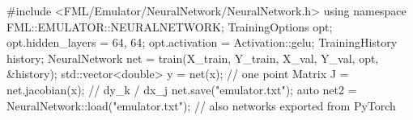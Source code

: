 \begin{cppcode}
#include <FML/Emulator/NeuralNetwork/NeuralNetwork.h>
using namespace FML::EMULATOR::NEURALNETWORK;
TrainingOptions opt;
opt.hidden_layers = {64, 64};
opt.activation = Activation::gelu;
TrainingHistory history;
NeuralNetwork net = train(X_train, Y_train, X_val, Y_val, opt, &history);
std::vector<double> y = net(x);              // one point
Matrix J = net.jacobian(x);                  // dy_k / dx_j
net.save("emulator.txt");
auto net2 = NeuralNetwork::load("emulator.txt");   // also networks exported from PyTorch
\end{cppcode}
